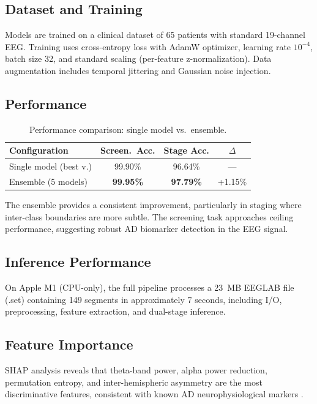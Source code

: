 \documentclass[twocolumn,11pt]{article}
\begin{document}
\subsection{Dataset and Training}

Models are trained on a clinical dataset of 65 patients with standard 19-channel EEG. Training uses cross-entropy loss with AdamW optimizer, learning rate $10^{-4}$, batch size 32, and standard scaling (per-feature z-normalization). Data augmentation includes temporal jittering and Gaussian noise injection.

\subsection{Performance}

\begin{table}[H]
\centering
\small
\caption{Performance comparison: single model vs.\ ensemble.}
\label{tab:results}
\begin{tabular}{@{}lccc@{}}
\toprule
\textbf{Configuration} & \textbf{Screen.\ Acc.} & \textbf{Stage Acc.} & \textbf{$\Delta$} \\
\midrule
Single model (best v.)  & 99.90\% & 96.64\% & --- \\
Ensemble (5 models)     & \textbf{99.95\%} & \textbf{97.79\%} & +1.15\% \\
\bottomrule
\end{tabular}
\end{table}

The ensemble provides a consistent improvement, particularly in staging where inter-class boundaries are more subtle. The screening task approaches ceiling performance, suggesting robust AD biomarker detection in the EEG signal.

\subsection{Inference Performance}

On Apple M1 (CPU-only), the full pipeline processes a 23~MB EEGLAB file (.set) containing 149 segments in approximately 7 seconds, including I/O, preprocessing, feature extraction, and dual-stage inference.

\subsection{Feature Importance}

SHAP analysis reveals that theta-band power, alpha power reduction, permutation entropy, and inter-hemispheric asymmetry are the most discriminative features, consistent with known AD neurophysiological markers \cite{jeong2004, dauwels2010}.
\end{document}
